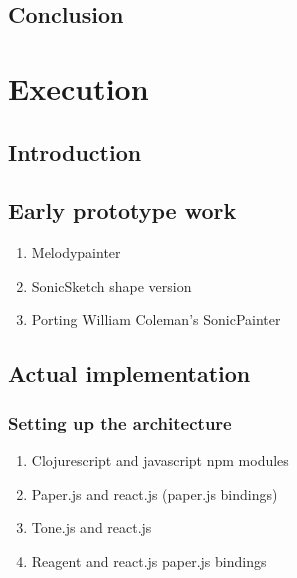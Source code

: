 \documentclass[a4paper,12pt]{article}
\begin{document}
\subsection{Conclusion}
\label{sec:orga2b93c0}

\section{Execution}
\label{sec:org24bf36e}

\subsection{Introduction}
\label{sec:org2c235eb}
\subsection{Early prototype work}
\label{sec:org4a6019c}
\begin{enumerate}
\item Melodypainter
\item SonicSketch shape version
\item Porting William Coleman's SonicPainter
\end{enumerate}
\subsection{Actual implementation}
\label{sec:orgffe94eb}
\subsubsection{Setting up the architecture}
\label{sec:orgcc20f04}
\begin{enumerate}
\item Clojurescript and javascript npm modules
\item Paper.js and react.js (paper.js bindings)
\item Tone.js and react.js
\item Reagent and react.js paper.js bindings
\end{enumerate}
\end{document}
